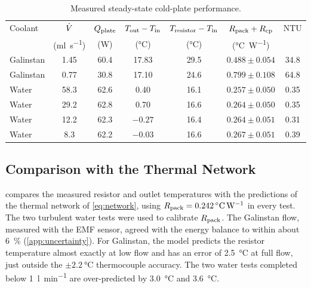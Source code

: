 \begin{table}[htbp]
  \centering
  \caption{Measured steady-state cold-plate performance.}
  \label{tab:measured-performance}
  \small
  \setlength{\tabcolsep}{4pt}
  \begin{tabular}{@{}lcccccc@{}}
    \toprule
    Coolant & $\dot{V}$ & $Q_{\mathrm{plate}}$ & $T_{\mathrm{out}} - T_{\mathrm{in}}$ & $T_{\mathrm{resistor}} - T_{\mathrm{in}}$
      & $R_{\mathrm{pack}} + R_{\mathrm{cp}}$ & NTU \\
     & (\si{\milli\litre\per\second}) & (\si{\watt}) & (\si{\celsius})
      & (\si{\celsius}) & (\si{\celsius\per\watt}) & \\
    \midrule
    Galinstan & 1.45\tnote{a} & 60.4 & 17.83   & 29.5 & $0.488 \pm 0.054$ & 34.8 \\
    Galinstan & 0.77\tnote{a} & 30.8 & 17.10   & 24.6 & $0.799 \pm 0.108$ & 64.8 \\
    Water     & 58.3 & 62.6 & 0.40    & 16.1 & $0.257 \pm 0.050$ & 0.35 \\
    Water     & 29.2 & 62.8 & 0.70    & 16.6 & $0.264 \pm 0.050$ & 0.35 \\
    Water     & 12.2 & 62.3 & $-0.27$ & 16.4 & $0.264 \pm 0.051$ & 0.31 \\
    Water     & 8.3  & 62.2 & $-0.03$ & 16.6 & $0.267 \pm 0.051$ & 0.39 \\
    \bottomrule
  \end{tabular}
\end{table}

\subsection{Comparison with the Thermal Network}
\label{sec:results-tn}

 compares the measured resistor and outlet temperatures
with the predictions of the thermal network of \cref{eq:network}, using
$R_{\mathrm{pack}} = \SI{0.242}{\celsius\per\watt}$ in every test. The two turbulent water
tests were used to calibrate $R_{\mathrm{pack}}$. The Galinstan flow, measured with the EMF
sensor, agreed with the energy balance to within about \SI{6}{\percent}
(\cref{app:uncertainty}). For
Galinstan, the model predicts the resistor temperature almost exactly at low flow and
has an error of \SI{2.5}{\celsius} at full flow, just outside the $\pm\SI{2.2}{\celsius}$
thermocouple accuracy. The two water tests completed below
\SI{1}{\litre\per\minute} are over-predicted by
\SI{3.0}{\celsius} and \SI{3.6}{\celsius}.

